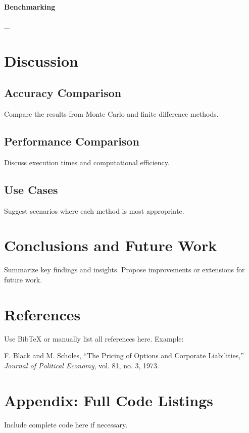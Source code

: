 \documentclass[12pt,a4paper]{report}
\begin{document}
\subsubsection{Benchmarking}
...


\chapter{Discussion}
\section{Accuracy Comparison}
Compare the results from Monte Carlo and finite difference methods.
\section{Performance Comparison}
Discuss execution times and computational efficiency.
\section{Use Cases}
Suggest scenarios where each method is most appropriate.

\chapter{Conclusions and Future Work}
Summarize key findings and insights. Propose improvements or extensions for future work.

\chapter*{References}
Use BibTeX or manually list all references here. Example:
\begin{thebibliography}{9}
F. Black and M. Scholes, ``The Pricing of Options and Corporate Liabilities,'' \textit{Journal of Political Economy}, vol. 81, no. 3, 1973.
\end{thebibliography}

\appendix
\chapter{Appendix: Full Code Listings}
Include complete code here if necessary.
\end{document}
